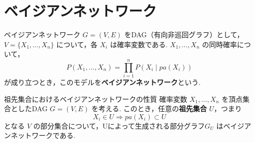 \documentclass[uplatex, dvipdfmx]{jsarticle}
\begin{document}
\newpage

\section{ベイジアンネットワーク}

\begin{defn}[label={defn:BN}]{ベイジアンネットワーク}
  $G = (V, E)$ をDAG（有向非巡回グラフ）として，$V = \{X_1, \dots, X_n\}$ について，各 $X_i$ は確率変数である.
  $X_1, \dots, X_n$ の同時確率について，
  \begin{equation}
      P(X_1, \dots, X_n) = \prod_{i=1}^{n} P(X_i \mid pa(X_i))
  \end{equation}
  が成り立つとき，このモデルを\textbf{ベイジアンネットワーク}という.
\end{defn}

\begin{prop}[label={prop:ancestor}]{祖先集合におけるベイジアンネットワークの性質}
  確率変数 $X_1, \dots, X_n$ を頂点集合としたDAG $G = (V, E)$ を考える.
  このとき，任意の\textbf{祖先集合} $U$，つまり
  \begin{equation}
      X_i \in U \Rightarrow pa(X_i) \subset U
  \end{equation}
  となる $V$ の部分集合について，Uによって生成される部分グラフ$G_U$ はベイジアンネットワークである.
\end{prop}
\end{document}
